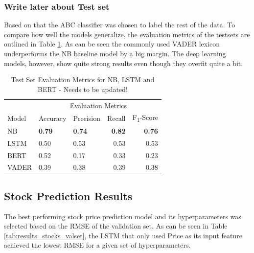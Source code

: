 \documentclass[11pt, a4paper]{article}
\begin{document}
\subsubsection{Write later about Test set}
Based on that the ABC classifier was chosen to label the rest of the data. To compare how well the models generalize, the evaluation metrics
of the testsets are outlined in Table \ref{tab:results}. As can be seen the commonly used VADER lexicon underperforms the NB baseline model by a big margin.
The deep learning models, however, show quite strong results even though they overfit quite a bit.

\begin{table}[!htb]
    \caption{Test Set Evaluation Metrics for NB, LSTM and BERT - Needs to be updated!}
    \label{tab:results}
    \centering
    \small

    \begin{tabular}{lllrr}
        \toprule
                                        & \multicolumn{4}{c}{Evaluation Metrics} \\
                                        \cmidrule{2-5}
                            Model       & Accuracy      & Precision     & Recall    & F\textsubscript{1}-Score \\
            \midrule
            \multirow{1}{*}{NB}         & \textbf{0.79}          & \textbf{0.74}          & \textbf{0.82}      & \textbf{0.76}                      \\
            \midrule
            \multirow{1}{*}{LSTM}       & 0.50          & 0.53          & 0.53      & 0.53                      \\
            \midrule
            \multirow{1}{*}{BERT}       & 0.52          & 0.17          & 0.33      & 0.23                      \\
            \midrule
            \multirow{1}{*}{VADER}      & 0.39          & 0.38          & 0.39      & 0.38                      \\

        \bottomrule
    \end{tabular}

\end{table}
\pagebreak
\pagebreak
\subsection{Stock Prediction Results}
The best performing stock price prediction model and its hyperparameters was selected based on the RMSE of the validation set. As can be seen
in Table \ref{tab:results_stocks_valset}, the LSTM that only used Price as its input feature achieved the lowest RMSE for a given set of hyperparameters.
\end{document}

